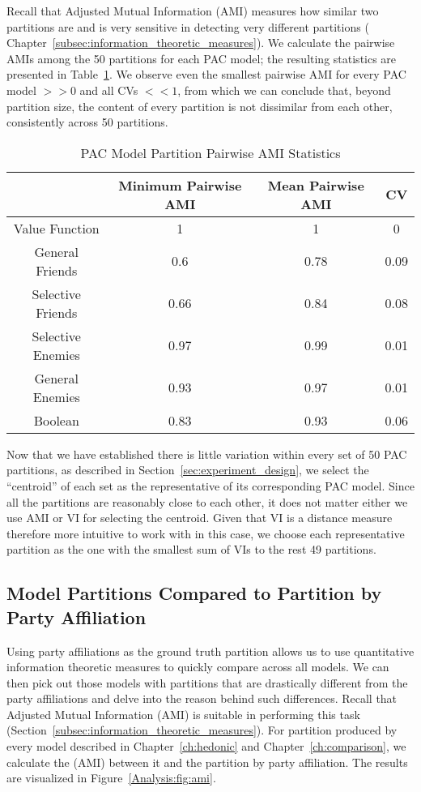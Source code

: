 Recall that Adjusted Mutual Information (AMI) measures how similar two
partitions are and is very sensitive in detecting very different partitions (
Chapter~\ref{subsec:information_theoretic_measures}).
We calculate the pairwise AMIs among the 50 partitions for each PAC model;
the resulting statistics are presented in
Table~\ref{analysis:table:pac_pairwise_amis}.
We observe even the smallest pairwise AMI for every PAC model $>> 0$ and all CVs
$<< 1$, from which we can conclude that, beyond partition size, the content
of every partition is not dissimilar from each other, consistently across 50
partitions.

\begin{table}[h!]
\centering
\begin{tabular}{|c|c|c|c|}
\hline
       & Minimum Pairwise AMI & Mean Pairwise AMI & CV \\ \hline
Value Function & 1 & 1 & 0 \\
General Friends & 0.6 & 0.78 & 0.09  \\
Selective Friends & 0.66 & 0.84 & 0.08  \\
Selective Enemies & 0.97 & 0.99 & 0.01 \\
General Enemies & 0.93 & 0.97 & 0.01 \\
Boolean & 0.83 & 0.93 & 0.06  \\
\hline
\end{tabular}
\caption{PAC Model Partition Pairwise AMI Statistics}
\label{analysis:table:pac_pairwise_amis}
\end{table}

Now that we have established there is little variation within every set of 50
PAC partitions, as described in Section~\ref{sec:experiment_design}, we select
the ``centroid'' of each set as the representative of its corresponding PAC model.
Since all the partitions are reasonably close to each other, it does not
matter either we use AMI or VI for selecting the centroid.
Given that VI is a distance measure therefore more intuitive to work with in
this case, we choose each representative partition as the one with the smallest
sum of VIs to the rest 49 partitions.

\subsection{Model Partitions Compared to Partition by Party Affiliation}
\label{subsec:partition_comparisons}

Using party affiliations as the ground truth partition allows us to use
quantitative information theoretic measures to quickly compare across all
models.
We can then pick out those models with partitions that are drastically
different from the party affiliations and delve into the reason behind such
differences.
Recall that Adjusted Mutual Information (AMI) is suitable in performing
this task (Section~\ref{subsec:information_theoretic_measures}).
For partition produced by every model described in Chapter~\ref{ch:hedonic} and
Chapter~\ref{ch:comparison}, we calculate the (AMI) between it and the partition
by party affiliation.
The results are visualized in Figure~\ref{Analysis:fig:ami}.

